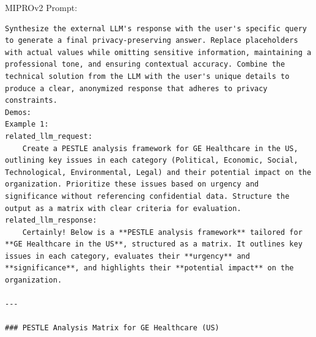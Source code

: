 \begin{instructbox}
MIPROv2 Prompt:
\begin{lstlisting}[breakindent=0pt, breaklines=true, breakatwhitespace=true, frame=single, backgroundcolor=\color{green!10}]
Synthesize the external LLM's response with the user's specific query to generate a final privacy-preserving answer. Replace placeholders with actual values while omitting sensitive information, maintaining a professional tone, and ensuring contextual accuracy. Combine the technical solution from the LLM with the user's unique details to produce a clear, anonymized response that adheres to privacy constraints.
Demos:
Example 1:
related_llm_request:
    Create a PESTLE analysis framework for GE Healthcare in the US, outlining key issues in each category (Political, Economic, Social, Technological, Environmental, Legal) and their potential impact on the organization. Prioritize these issues based on urgency and significance without referencing confidential data. Structure the output as a matrix with clear criteria for evaluation.
related_llm_response:
    Certainly! Below is a **PESTLE analysis framework** tailored for **GE Healthcare in the US**, structured as a matrix. It outlines key issues in each category, evaluates their **urgency** and **significance**, and highlights their **potential impact** on the organization.

---

### PESTLE Analysis Matrix for GE Healthcare (US)


\end{lstlisting}
\end{instructbox}
